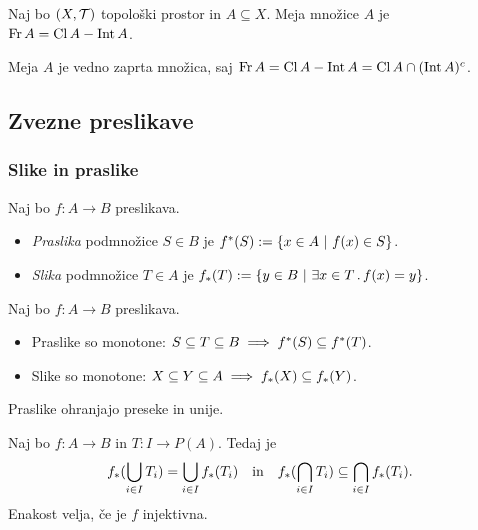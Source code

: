 \begin{trditev}
    Naj bo $(X, \mathcal{T})$ topološki prostor in $A \subseteq X$. Meja množice $A$ je $\operatorname{Fr} A = \operatorname{Cl} A - \operatorname{Int} A$.
\end{trditev}

\begin{opomba}
    Meja $A$ je vedno zaprta množica, saj $\operatorname{Fr} A = \operatorname{Cl} A - \operatorname{Int} A = \operatorname{Cl} A \cap (\operatorname{Int} A)^c$.
\end{opomba}

\subsection{Zvezne preslikave}
\subsubsection{Slike in praslike}
\begin{definicija}
    Naj bo $f: A \to B$ preslikava.
    \begin{itemize}
        \item \emph{Praslika} podmnožice $S \in B$ je $f^*(S) := \left\{x \in A \ | \ f(x) \in S\right\}$.
        \item \emph{Slika} podmnožice $T \in A$ je $f_*(T) := \left\{y \in B \ | \ \exists x \in T \,.\, f(x) = y\right\}$.
    \end{itemize}
\end{definicija}

\begin{trditev}
    Naj bo $f: A \to B$ preslikava.
    \begin{itemize}
        \item Praslike so monotone: $S \subseteq T \subseteq B \implies f^{*}(S) \subseteq f^{*}(T)$.
        \item Slike so monotone: $X \subseteq Y \subseteq A \implies f_{*}(X) \subseteq f_{*}(Y)$.
    \end{itemize}
\end{trditev}

\begin{trditev}
    Praslike ohranjajo preseke in unije.
\end{trditev}

\begin{trditev}
    Naj bo $f: A \to B$ in $T: I \to P(A)$. Tedaj je
    $$f_{*}(\bigcup_{i \in I} T_i) = \bigcup_{i \in I} f_{*}(T_i) \quad \text{in} \quad f_{*}(\bigcap_{i \in I} T_i) \subseteq \bigcap_{i \in I} f_{*}(T_i).$$
    Enakost velja, če je $f$ injektivna.
\end{trditev}

